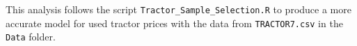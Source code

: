 %
%


This analysis follows the script \texttt{Tractor\_Sample\_Selection.R} to produce a more accurate model for used tractor prices with the data from \texttt{TRACTOR7.csv} in the \texttt{Data} folder. 

